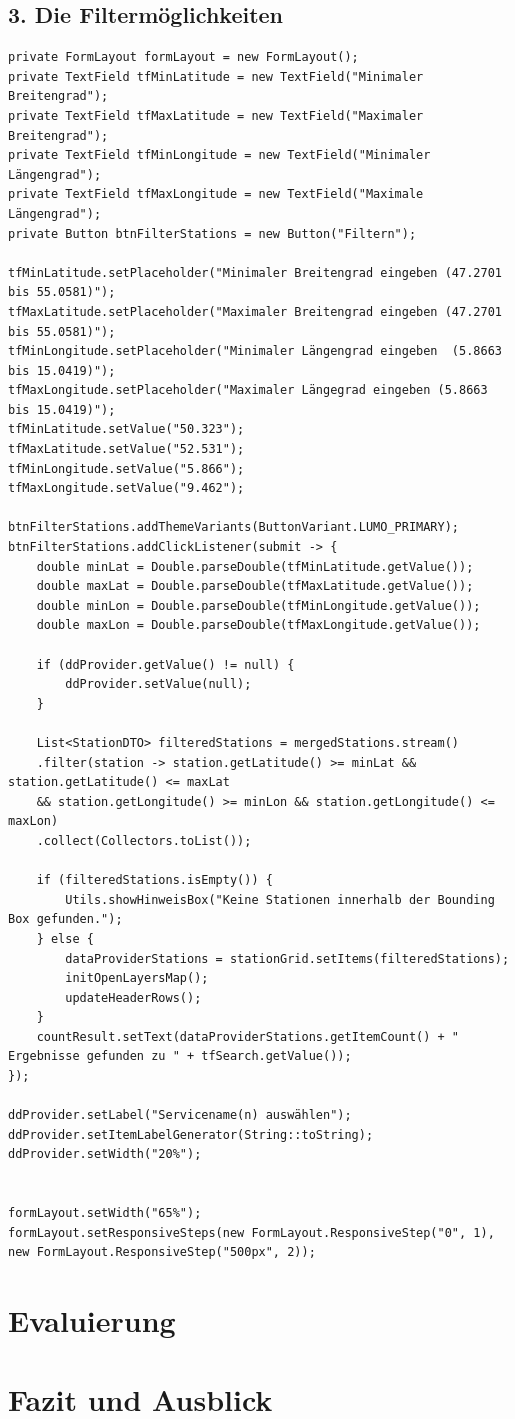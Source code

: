 \documentclass[a4paper,12pt]{scrreprt}
\begin{document}
\section*{\small \textbf{3. Die Filtermöglichkeiten}}
\begin{lstlisting}
private FormLayout formLayout = new FormLayout();
private TextField tfMinLatitude = new TextField("Minimaler Breitengrad");
private TextField tfMaxLatitude = new TextField("Maximaler Breitengrad");
private TextField tfMinLongitude = new TextField("Minimaler Längengrad");
private TextField tfMaxLongitude = new TextField("Maximale Längengrad");
private Button btnFilterStations = new Button("Filtern");

tfMinLatitude.setPlaceholder("Minimaler Breitengrad eingeben (47.2701 bis 55.0581)");
tfMaxLatitude.setPlaceholder("Maximaler Breitengrad eingeben (47.2701 bis 55.0581)");
tfMinLongitude.setPlaceholder("Minimaler Längengrad eingeben  (5.8663 bis 15.0419)");
tfMaxLongitude.setPlaceholder("Maximaler Längegrad eingeben (5.8663 bis 15.0419)");
tfMinLatitude.setValue("50.323");
tfMaxLatitude.setValue("52.531");
tfMinLongitude.setValue("5.866");
tfMaxLongitude.setValue("9.462");

btnFilterStations.addThemeVariants(ButtonVariant.LUMO_PRIMARY);
btnFilterStations.addClickListener(submit -> {
	double minLat = Double.parseDouble(tfMinLatitude.getValue());
	double maxLat = Double.parseDouble(tfMaxLatitude.getValue());
	double minLon = Double.parseDouble(tfMinLongitude.getValue());
	double maxLon = Double.parseDouble(tfMaxLongitude.getValue());
	
	if (ddProvider.getValue() != null) {
		ddProvider.setValue(null);
	}
	
	List<StationDTO> filteredStations = mergedStations.stream()
	.filter(station -> station.getLatitude() >= minLat && station.getLatitude() <= maxLat
	&& station.getLongitude() >= minLon && station.getLongitude() <= maxLon)
	.collect(Collectors.toList());
	
	if (filteredStations.isEmpty()) {
		Utils.showHinweisBox("Keine Stationen innerhalb der Bounding Box gefunden.");
	} else {
		dataProviderStations = stationGrid.setItems(filteredStations);
		initOpenLayersMap();
		updateHeaderRows();
	}
	countResult.setText(dataProviderStations.getItemCount() + " Ergebnisse gefunden zu " + tfSearch.getValue());
});

ddProvider.setLabel("Servicename(n) auswählen");
ddProvider.setItemLabelGenerator(String::toString);
ddProvider.setWidth("20%");


formLayout.setWidth("65%");
formLayout.setResponsiveSteps(new FormLayout.ResponsiveStep("0", 1), 
new FormLayout.ResponsiveStep("500px", 2));
\end{lstlisting}


\chapter{Evaluierung}
	
\chapter{Fazit und Ausblick}
	
\printbibliography
\end{document}

